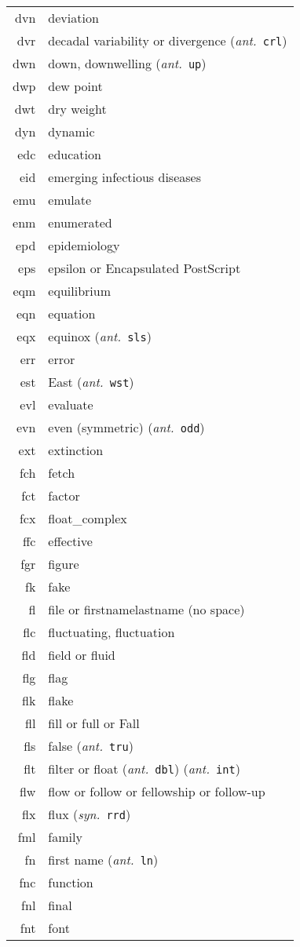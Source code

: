 \documentclass[12pt,twoside]{article}
\newcommand{\ant}[1]{(\textit{ant.}~\texttt{#1})}
\newcommand{\syn}[1]{(\textit{syn.}~\texttt{#1})}
\begin{document}
\begin{longtable}[>{\bfseries}l]{>{\ttfamily}r l}
dvn & deviation \\
dvr & decadal variability or divergence \ant{crl} \\
dwn & down, downwelling \ant{up} \\
dwp & dew point \\
dwt & dry weight \\
dyn & dynamic \\
edc & education \\
eid & emerging infectious diseases \\
emu & emulate \\
enm & enumerated \\
epd & epidemiology \\
eps & epsilon or Encapsulated PostScript \\
eqm & equilibrium \\
eqn & equation \\
eqx & equinox \ant{sls} \\
err & error \\
est & East \ant{wst} \\
evl & evaluate \\
evn & even (symmetric) \ant{odd} \\
ext & extinction \\
fch & fetch \\
fct & factor \\
fcx & float\_complex \\
ffc & effective \\
fgr & figure \\
fk & fake \\
fl & file or firstnamelastname (no space) \\
flc & fluctuating, fluctuation \\
fld & field or fluid \\
flg & flag \\
flk & flake \\
fll & fill or full or Fall \\
fls & false \ant{tru} \\
flt & filter or float \ant{dbl} \ant{int} \\
flw & flow or follow or fellowship or follow-up \\
flx & flux \syn{rrd} \\
fml & family \\
fn & first name \ant{ln} \\
fnc & function \\
fnl & final \\
fnt & font \\

\end{longtable}
\end{document}

